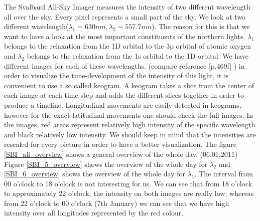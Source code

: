 \documentclass[10pt,a4paper]{article}
\begin{document}
The Svalbard All-Sky Imager measures the intensity of two different wavelength all over the sky. Every pixel represents a small part of the sky. We look at two different 
wavelength($\lambda_1=630 nm, \lambda_2= 557.7 nm$). The reason for this is that we want to have a look at the most important constituents of the northern lights. 
$\lambda_1$ belongs to the relaxation from the 1D orbital to the 3p orbital of atomic oxygen and $\lambda_2$ belongs to the relaxation from the 1s orbital to the 1D 
orbital. We have different images for each of these wavelengths. (compare reference \cite{Buch2}[p.469f] )
in order to visualize the time-development of the intensity of this light, it is convenient to use a so called keogram. A keogram takes a slice from the center of each 
image at each time  step and adds the different slices together in order to produce a timeline. Longitudinal movements are easily detected in keograms, however for 
the exact latitudinal movements one should check the full images. In the images, red areas represent relatively high intensity of the specific wavelength and black 
relatively low intensity. We should keep in mind that the intensities are rescaled for every picture in order to have a better visualization. 
The figure \ref{SBI_all_overview} shows a general overview of the whole day. (06.01.2011) Figure \ref{SBI_5_overview} shows the overview of the whole day for 
$\lambda_2$ and \ref{SBI_6_overview} shows the overview of the whole day for $\lambda_1$. The interval from 00 o'clock to 18 o'clock is not interesting for us. 
We can see that from 18 o'clock to approximately 22 o'clock, the intensity on both images are really low; whereas from 22 o'clock to 00 o'clock (7th January) 
we can see that we have high intensity over all longitudes represented by the red colour.
\end{document}
